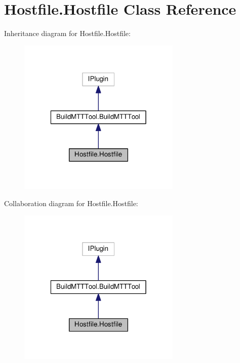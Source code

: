 \hypertarget{class_hostfile_1_1_hostfile}{\section{Hostfile.\-Hostfile Class Reference}
\label{class_hostfile_1_1_hostfile}
}


Inheritance diagram for Hostfile.\-Hostfile\-:
\nopagebreak
\begin{figure}[H]
\begin{center}
\leavevmode
\includegraphics[width=220pt]{class_hostfile_1_1_hostfile__inherit__graph}
\end{center}
\end{figure}


Collaboration diagram for Hostfile.\-Hostfile\-:
\nopagebreak
\begin{figure}[H]
\begin{center}
\leavevmode
\includegraphics[width=220pt]{class_hostfile_1_1_hostfile__coll__graph}
\end{center}
\end{figure}
